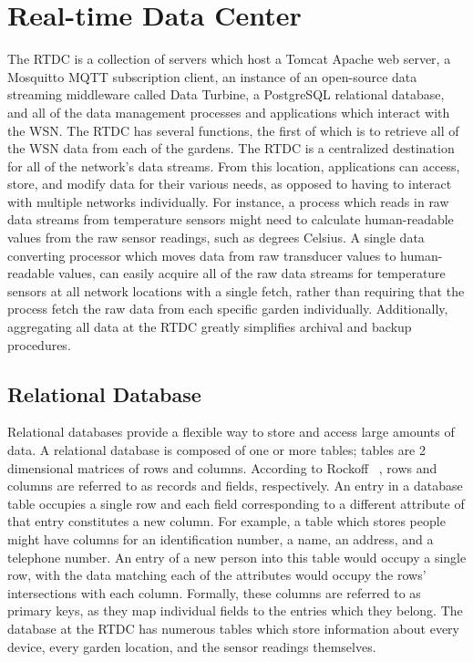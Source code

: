 \section{Real-time Data Center}
The RTDC is a collection of servers which host a Tomcat Apache web server, a Mosquitto MQTT subscription client, an instance of an open-source data streaming middleware called Data Turbine, a PostgreSQL relational database, and all of the data management processes and applications which interact with the WSN. The RTDC has several functions, the first of which is to retrieve all of the WSN data from each of the gardens. The RTDC is a centralized destination for all of the network's data streams. From this location, applications can access, store, and modify data for their various needs, as opposed to having to interact with multiple networks individually. For instance, a process which reads in raw data streams from temperature sensors might need to calculate human-readable values from the raw sensor readings, such as degrees Celsius. A single data converting processor which moves data from raw transducer values to human-readable values, can easily acquire all of the raw data streams for temperature sensors at all network locations with a single fetch, rather than requiring that the process fetch the raw data from each specific garden individually. Additionally, aggregating all data at the RTDC greatly simplifies archival and backup procedures.\\

\subsection{Relational Database}
Relational databases provide a flexible way to store and access large amounts of data. A relational database is composed of one or more tables; tables are 2 dimensional matrices of rows and columns. According to Rockoff ~\cite{rockoff2010language}, rows and columns are referred to as records and fields, respectively. An entry in a database table occupies a single row and each field corresponding to a different attribute of that entry constitutes a new column. For example, a table which stores people might have columns for an identification number, a name, an address, and a telephone number. An entry of a new person into this table would occupy a single row, with the data matching each of the attributes would occupy the rows' intersections with each column. Formally, these columns are referred to as primary keys, as they map individual fields to the entries which they belong. The database at the RTDC has numerous tables which store information about every device, every garden location, and the sensor readings themselves.\\ 

